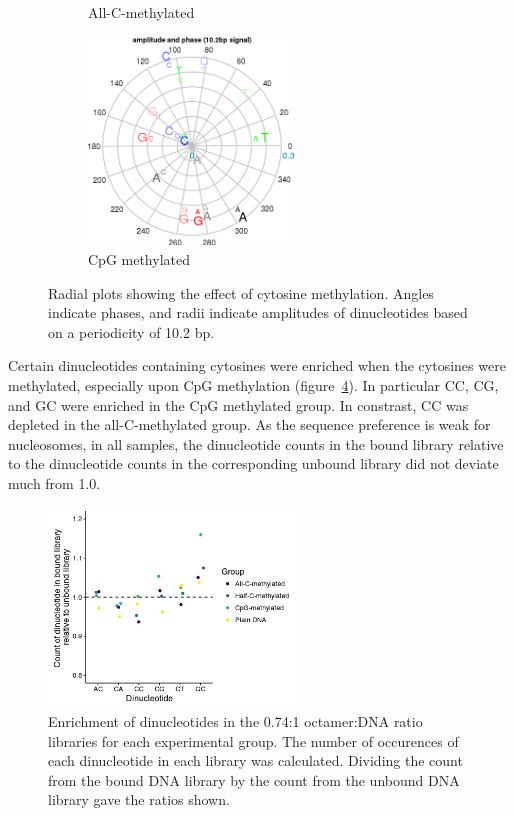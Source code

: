 \documentclass[parskip=full, numbers=noenddot]{scrbook}
\begin{document}
\begin{figure}[htbp]
\begin{subfigure}[htbp]{0.6\textwidth}
    \caption{All-C-methylated}
    \label{fig:radial_mc_allmc}
  \end{subfigure}
  \begin{subfigure}[htbp]{0.6\textwidth}
    \centering
    \includegraphics[width=0.6\textwidth]{emsa_h8_radial}
    \caption{CpG methylated}
    \label{fig:radial_mc_cpg}
  \end{subfigure}
  \caption{Radial plots showing the effect of cytosine methylation.  Angles indicate phases, and radii indicate amplitudes of dinucleotides based on a periodicity of 10.2 bp.}
  \label{fig:radial_mc}
\end{figure}

Certain dinucleotides containing cytosines were enriched when the cytosines were methylated, especially upon CpG methylation (figure~\ref{fig:c2nt}).  In particular CC, CG, and GC were enriched in the CpG methylated group.  In constrast, CC was depleted in the all-C-methylated group.  As the sequence preference is weak for nucleosomes, in all samples, the dinucleotide counts in the bound library relative to the dinucleotide counts in the corresponding unbound library did not deviate much from 1.0.

\begin{figure}[htbp]
  \centering
  \includegraphics[width=0.6\textwidth]{c2nt}
  \caption{Enrichment of dinucleotides in the 0.74:1 octamer:DNA ratio libraries for each experimental group.  The number of occurences of each dinucleotide in each library was calculated.  Dividing the count from the bound DNA library by the count from the unbound DNA library gave the ratios shown.} 
  \label{fig:c2nt}
\end{figure}
\end{document}
